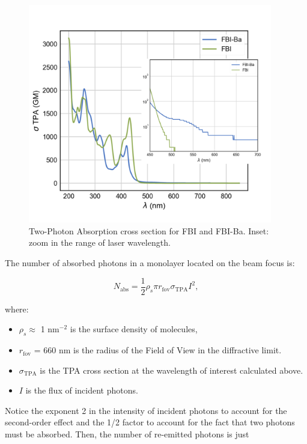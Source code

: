 \documentclass{article}
\begin{document}
\begin{figure}[ht!]
	\includegraphics[width=0.95\textwidth]{figures/2PA_absospect.png}
	\caption{\label{absorSpectrum} Two-Photon Absorption cross section for FBI and FBI-Ba. Inset: zoom in the range of laser wavelength.}
\end{figure}

The number of absorbed photons in a monolayer located on the beam focus is:

\begin{equation}
    N_{\mathrm{abs}} = \frac{1}{2}\rho_s \pi r_{\mathrm{fov}} \sigma_{\mathrm{TPA}} I^2,
\end{equation}

where:
\begin{itemize}
    \item $\rho_s \approx$ 1 nm$^{-2}$ is the surface density of molecules,
    \item $r_{\mathrm{fov}}$ = 660 nm is the radius of the Field of View in the diffractive limit.
    \item  $\sigma_{\mathrm{TPA}} $ is the TPA cross section at the wavelength of interest calculated above.
    \item $I$ is the flux of incident photons.
\end{itemize}

Notice the exponent 2 in the intensity of incident photons to account for the second-order effect and the 1/2 factor to account for the fact that two photons must be absorbed. Then, the number of re-emitted photons is just
\end{document}
